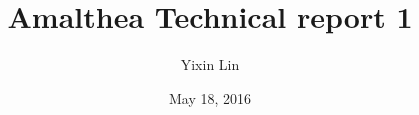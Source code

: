 \documentclass[english]{article}
\begin{document}
\title{Amalthea Technical report 1}
\author{Yixin Lin}
\date{May 18, 2016}
\maketitle






\newpage


\end{document}
